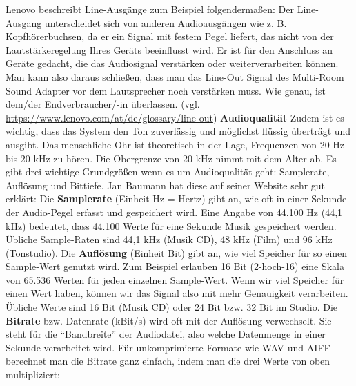 \documentclass[11pt, twoside]{article}
\begin{document}
Lenovo beschreibt Line-Ausgänge zum Beispiel folgendermaßen: \glqq Der Line-Ausgang unterscheidet sich von anderen Audioausgängen wie z. B. Kopfhörerbuchsen, da er ein Signal mit festem Pegel liefert, das nicht von der Lautstärkeregelung Ihres Geräts beeinflusst wird. Er ist für den Anschluss an Geräte gedacht, die das Audiosignal verstärken oder weiterverarbeiten können.\grqq{} \newline
Man kann also daraus schließen, dass man das Line-Out Signal des Multi-Room Sound Adapter vor dem Lautsprecher noch verstärken muss. Wie genau, ist dem/der Endverbraucher/-in überlassen.
\vspace{4mm} \newline
(vgl. \url{https://www.lenovo.com/at/de/glossary/line-out})
\vspace{4mm}\newline
\textbf{Audioqualität}\newline
Zudem ist es wichtig, dass das System den Ton zuverlässig und möglichst flüssig überträgt und ausgibt.\newline
\glqq Das menschliche Ohr ist theoretisch in der Lage, Frequenzen von 20 Hz bis 20 kHz zu hören. Die
Obergrenze von 20 kHz nimmt mit dem Alter ab. \grqq{} \newline
Es gibt drei wichtige Grundgrößen wenn es um Audioqualität geht: Samplerate, Auflösung und Bittiefe. Jan Baumann hat diese auf seiner Website sehr gut erklärt:
\vspace{4mm}\newline
\glqq Die \textbf{Samplerate} (Einheit Hz = Hertz) gibt an, wie oft in einer Sekunde der Audio-Pegel erfasst und gespeichert wird. Eine Angabe von 44.100 Hz (44,1 kHz) bedeutet, dass 44.100 Werte für eine Sekunde Musik gespeichert werden. Übliche Sample-Raten sind 44,1 kHz (Musik CD), 48 kHz (Film) und 96 kHz (Tonstudio). \grqq{}
\vspace{4mm}\newline
\glqq Die \textbf{Auflösung} (Einheit Bit) gibt an, wie viel Speicher für so einen Sample-Wert genutzt wird. Zum Beispiel erlauben 16 Bit (2-hoch-16) eine Skala von 65.536 Werten für jeden einzelnen Sample-Wert. Wenn wir viel Speicher für einen Wert haben, können wir das Signal also mit mehr Genauigkeit verarbeiten. Übliche Werte sind 16 Bit (Musik CD) oder 24 Bit bzw. 32 Bit im Studio.\grqq{}
\vspace{4mm}\newline
\glqq Die \textbf{Bitrate} bzw. Datenrate (kBit/s) wird oft mit der Auflösung verwechselt. Sie steht für die “Bandbreite” der Audiodatei, also welche Datenmenge in einer Sekunde verarbeitet wird. Für unkomprimierte Formate wie WAV und AIFF berechnet man die Bitrate ganz einfach, indem man die drei Werte von oben multipliziert: \grqq{}\newline
\end{document}

